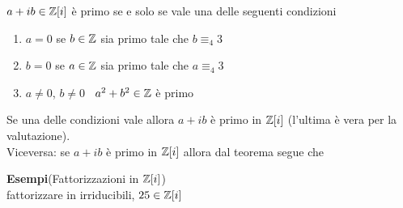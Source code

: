 \documentclass[12px]{article}
\begin{document}
 \begin{coro}
	 $a + ib\in\mathbb{Z}[i]$ è primo se e solo se vale una delle seguenti condizioni
	 \begin{enumerate}
		 \item $a = 0$ se $b\in \mathbb{Z}$ sia primo tale che  $b\equiv_4 3$
		 \item  $b = 0$ se $a \in \mathbb{Z}$ sia primo tale che  $a \equiv_4 3$
		 \item $a \neq 0$,  $b\neq 0$ \  $a^2 + b^2\in\mathbb{Z}$ è primo
	 \end{enumerate}
 \end{coro}
 \begin{dimo}
	 Se una delle condizioni vale allora $a + ib$ è primo in  $\mathbb{Z}[i]$ (l'ultima è vera per la valutazione).\\
	 Viceversa: se $a + ib$ è primo in  $\mathbb{Z}[i]$ allora dal teorema segue che 
 \end{dimo}
 \textbf{Esempi}(Fattorizzazioni in $\mathbb{Z}[i]$)\\
 fattorizzare in irriducibili, $25\in\mathbb{Z}[i]$\\
\end{document}
